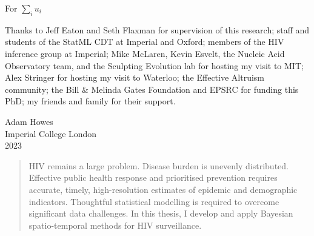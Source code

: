 \documentclass[a4paper, nobind]{templates/ociamthesis}
\begin{document}

\begin{romanpages}

\maketitle

\begin{dedication}
  For \(\sum_i u_i\)
\end{dedication}

\begin{acknowledgements}
 	Thanks to Jeff Eaton and Seth Flaxman for supervision of this research;
 staff and students of the StatML CDT at Imperial and Oxford;
 members of the HIV inference group at Imperial;
 Mike McLaren, Kevin Esvelt, the Nucleic Acid Observatory team, and the Sculpting Evolution lab for hosting my visit to MIT;
 Alex Stringer for hosting my visit to Waterloo;
 the Effective Altruism community;
 the Bill \& Melinda Gates Foundation and EPSRC for funding this PhD;
 my friends and family for their support.

 \begin{flushright}
 Adam Howes \\
 Imperial College London\\
 2023
 \end{flushright}
\end{acknowledgements}


\begin{abstract}
	HIV remains a large problem.
Disease burden is unevenly distributed.
Effective public health response and prioritised prevention requires accurate, timely, high-resolution estimates of epidemic and demographic indicators.
Thoughtful statistical modelling is required to overcome significant data challenges.
In this thesis, I develop and apply Bayesian spatio-temporal methods for HIV surveillance.
\end{abstract}


\end{romanpages}
\end{document}
